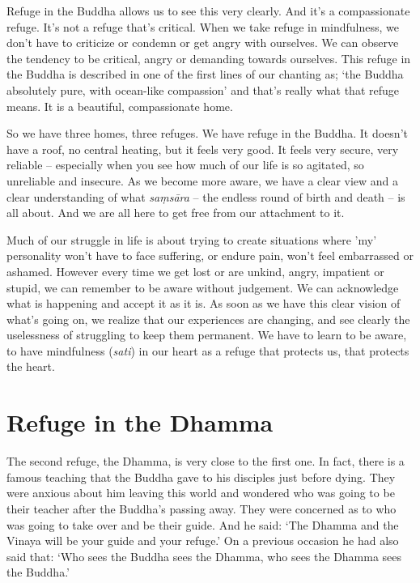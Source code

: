 Refuge in the Buddha allows us to see this very clearly. And it's a compassionate refuge. It's not a refuge that's critical. When we take refuge in mindfulness, we don't have to criticize or condemn or get angry with ourselves. We can observe the tendency to be critical, angry or demanding towards ourselves. This refuge in the Buddha is described in one of the first lines of our chanting as; `the Buddha absolutely pure, with ocean-like compassion' and that's really what that refuge means. It is a beautiful, compassionate home.

So we have three homes, three refuges. We have refuge in the Buddha. It doesn't have a roof, no central heating, but it feels very good. It feels very secure, very reliable -- especially when you see how much of our life is so agitated, so unreliable and insecure. As we become more aware, we have a clear view and a clear understanding of what \textit{sa\d{m}s\=ara} -- the endless round of birth and death -- is all about. And we are all here to get free from our attachment to it.

Much of our struggle in life is about trying to create situations where 'my' personality won't have to face suffering, or endure pain, won't feel embarrassed or ashamed. However every time we get lost or are unkind, angry, impatient or stupid, we can remember to be aware without judgement. We can acknowledge what is happening and accept it as it is. As soon as we have this clear vision of what's going on, we realize that our experiences are changing, and see clearly the uselessness of struggling to keep them permanent. We have to learn to be aware, to have mindfulness (\textit{sati}) in our heart as a refuge that protects us, that protects the heart.

\section*{Refuge in the Dhamma}

The second refuge, the Dhamma, is very close to the first one. In fact, there is a famous teaching that the Buddha gave to his disciples just before dying. They were anxious about him leaving this world and wondered who was going to be their teacher after the Buddha's passing away. They were concerned as to who was going to take over and be their guide. And he said: `The Dhamma and the Vinaya will be your guide and your refuge.' On a previous occasion he had also said that: `Who sees the Buddha sees the Dhamma, who sees the Dhamma sees the Buddha.'

